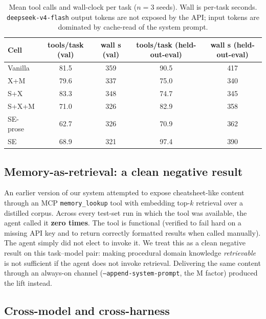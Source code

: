 \documentclass{article}
\begin{document}
\begin{table}[h]
  \caption{Mean tool calls and wall-clock per task ($n=3$ seeds). Wall is per-task seconds. \texttt{deepseek-v4-flash} output tokens are not exposed by the API; input tokens are dominated by cache-read of the system prompt.}
  \label{tab:efficiency}
  \centering
  \small
  \begin{tabular}{lcccc}
    \toprule
    \textbf{Cell} & \textbf{tools/task (val)} & \textbf{wall s (val)} & \textbf{tools/task (held-out-eval)} & \textbf{wall s (held-out-eval)} \\
    \midrule
    Vanilla  & 81.5 & 359 & 90.5 & 417 \\
    X+M  & 79.6 & 337 & 75.0 & 340 \\
    S+X  & 83.3 & 348 & 74.7 & 345 \\
    S+X+M  & 71.0 & 326 & 82.9 & 358 \\
    SE-prose & 62.7 & 326 & 70.9 & 362 \\
    SE  & 68.9 & 321 & 97.4 & 390 \\
    \bottomrule
  \end{tabular}
\end{table}

\subsection{Memory-as-retrieval: a clean negative result}
\label{subsec:memory-negative}

An earlier version of our system attempted to expose cheatsheet-like content through an MCP \texttt{memory\_lookup} tool with embedding top-$k$ retrieval over a distilled corpus. Across every test-set run in which the tool was available, the agent called it \textbf{zero times}. The tool is functional (verified to fail hard on a missing API key and to return correctly formatted results when called manually). The agent simply did not elect to invoke it. We treat this as a clean negative result on this task--model pair: making procedural domain knowledge \emph{retrievable} is not sufficient if the agent does not invoke retrieval. Delivering the same content through an always-on channel (\texttt{--append-system-prompt}, the M factor) produced the lift instead.

\subsection{Cross-model and cross-harness}
\label{subsec:cross-cutting}
\end{document}
